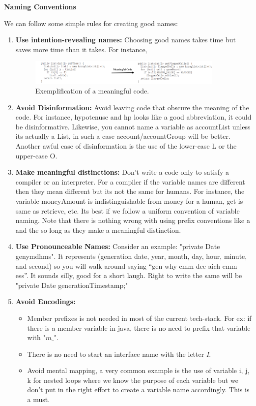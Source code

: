 \documentclass[12pt]{article}
\begin{document}
{\Large \textbf{Naming Conventions}\par}
We can follow some simple rules for creating good names:
\begin{enumerate}
    \item \textbf{Use intention-revealing names: }Choosing good names takes time but saves more time than it takes. For instance,
        \begin{figure}[h]
         \centering
          \includegraphics[width=0.9\textwidth]{CleanCodeImages/CleanCode.png}
         \caption{Exemplification of a meaningful code.}
         \label{fig:screenshot}
        \end{figure}   
        
    \item \textbf{Avoid Disinformation: }Avoid leaving code that obscure the meaning of the code. For instance, hypotenuse and hp looks like a good abbreviation, it could be disinformative. Likewise, you cannot name a variable as accountList unless its actually a List, in such a case account/accountGroup will be better. Another awful case of disinformation is the use of the lower-case L or the upper-case O.
    
    \item \textbf{Make meaningful distinctions:} Don't write a code only to satisfy a compiler or an interpreter. For a compiler if the variable names are different then they mean different but its not the same for humans. For instance, the variable moneyAmount is indistinguishable from money for a human, get is same as retrieve, etc. Its best if we follow a uniform convention of variable naming. Note that there is nothing wrong with using prefix conventions like a and the so long as they make a meaningful distinction.
    
    \item \textbf{Use Pronounceable Names: } Consider an example: "private Date genymdhms". It represents (generation date, year, month, day, hour, minute, and second) so you will walk around saying “gen why emm dee aich emm ess”. It sounds silly, good for a short laugh. Right to write the same will be "private Date generationTimestamp;"
    
    \item \textbf{Avoid Encodings: }
    \begin{itemize}
        \item Member prefixes is not needed in most of the current tech-stack. For ex: if there is a member variable in java, there is no need to prefix that variable with "\textit{$m\_$}".
        \item There is no need to start an interface name with the letter \textit{I}.
        \item Avoid mental mapping, a very common example is the use of variable i, j, k for nested loops where we know the purpose of each variable but we don't put in the right effort to create a variable name accordingly. This is a must.


\end{itemize}
\end{enumerate}
\end{document}
